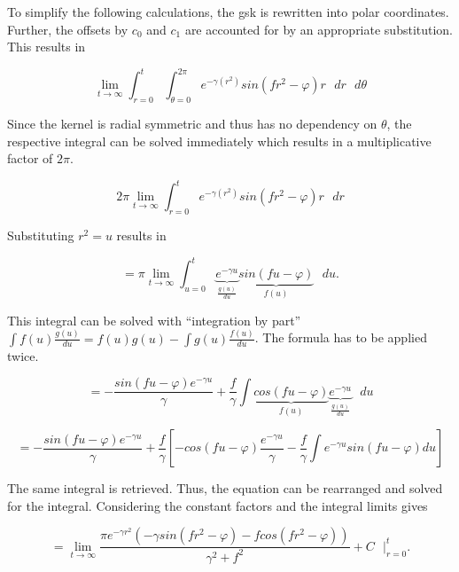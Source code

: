 \documentclass[./\jobname.tex]{subfiles}
\begin{document}
To simplify the following calculations, the \gls{gsk} is rewritten into polar coordinates. Further, the offsets by $c_0$ and $c_1$ are accounted for by an appropriate substitution. This results in 

\begin{equation}
\lim_{t \to \infty} \int_{r=0}^{t} \int_{\theta = 0}^{2 \pi} e^{-\gamma(r^2)} sin(f r^2 - \varphi) r \text{ } dr \text{ } d\theta
\end{equation}

Since the kernel is radial symmetric and thus has no dependency on $\theta$, the respective integral can be solved immediately which results in a multiplicative factor of $2 \pi$. 

\begin{equation}
2 \pi \lim_{t \to \infty} \int_{r=0}^{t} e^{-\gamma(r^2)} sin(f r^2 - \varphi) r \text{ } dr 
\end{equation}

Substituting $r^2 = u$ results in 

\begin{equation}
= \pi \lim_{t \to \infty} \int_{u=0}^{t} \underbrace{e^{-\gamma u }}_{\frac{g(u)}{du}} \underbrace{sin(f u - \varphi)}_{f(u)} \text{ } du.
\end{equation}

This integral can be solved with ``integration by part'' $\int f(u) \frac{g(u)}{du} = f(u) g(u) - \int g(u) \frac{f(u)}{du}$. The formula has to be applied twice. 

\begin{equation}
= - \frac{sin(fu - \varphi) e^{-\gamma u}}{\gamma} + \frac{f}{\gamma} \int \underbrace{cos(fu -\varphi)}_{f(u)} \underbrace{e^{-\gamma u}}_{\frac{g(u)}{du}} \text{ }du
\end{equation}

\begin{equation}
= - \frac{sin(fu - \varphi) e^{-\gamma u}}{\gamma} +\frac{f}{\gamma} \left[ -cos(fu -\varphi) \frac{e^{-\gamma u}}{\gamma} -\frac{f}{\gamma} \int e^{-\gamma u} sin(fu -\varphi) du \right]
\end{equation}

The same integral is retrieved. Thus, the equation can be rearranged and solved for the integral. Considering the constant factors and the integral limits gives 

\begin{equation}
= \lim_{t \to \infty} \frac{\pi e^{-\gamma r^2}(- \gamma sin(f r^2 - \varphi) - f cos(f r^2 - \varphi))}{ \gamma^2 + f^2} + C \text{ } \Bigg|_{r=0}^{t}.
\end{equation}
\end{document}
